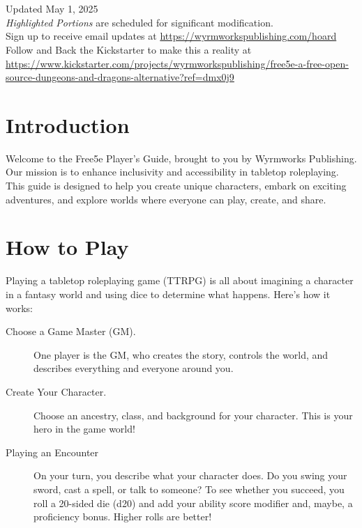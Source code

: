\section{}

Updated May 1, 2025\\
\emph{Highlighted Portions} are scheduled for significant
modification.\\
Sign up to receive email updates at
\url{https://wyrmworkspublishing.com/hoard}\\
Follow and Back the Kickstarter to make this a reality at
\url{https://www.kickstarter.com/projects/wyrmworkspublishing/free5e-a-free-open-source-dungeons-and-dragons-alternative?ref=dmx0j9}

\section{Introduction}\label{_introduction}

Welcome to the Free5e Player's Guide, brought to you by Wyrmworks
Publishing. Our mission is to enhance inclusivity and accessibility in
tabletop roleplaying. This guide is designed to help you create unique
characters, embark on exciting adventures, and explore worlds where
everyone can play, create, and share.

\section{How to Play}\label{_how_to_play}

Playing a tabletop roleplaying game (TTRPG) is all about imagining a
character in a fantasy world and using dice to determine what happens.
Here's how it works:

\begin{description}
\item[Choose a Game Master (GM).]
One player is the GM, who creates the story, controls the world, and
describes everything and everyone around you.
\item[Create Your Character.]
Choose an ancestry, class, and background for your character. This is
your hero in the game world!
\item[Playing an Encounter]
On your turn, you describe what your character does. Do you swing your
sword, cast a spell, or talk to someone? To see whether you succeed, you
roll a 20-sided die (d20) and add your ability score modifier and,
maybe, a proficiency bonus. Higher rolls are better!
\end{description}

